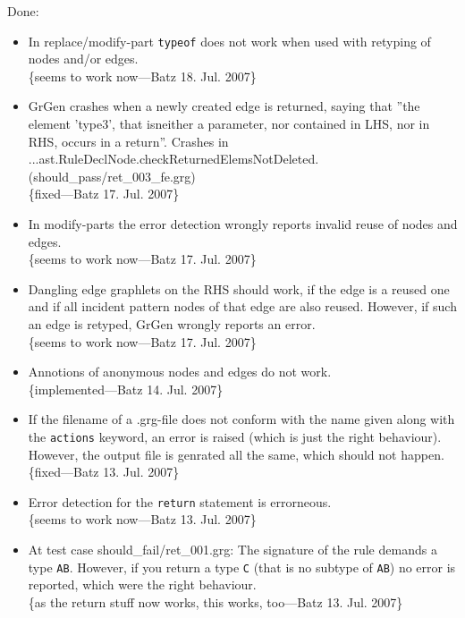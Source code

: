 \documentclass[12pt,a4paper]{article}
\begin{document}
\noindent
Done:
\begin{itemize}
	\item In replace/modify-part {\tt typeof} does not work when used with retyping of nodes and/or edges.\\
		\{seems to work now---Batz 18. Jul. 2007\}
    \item GrGen crashes when a newly created edge is returned, saying that ''the element 'type3', that isneither a parameter, nor contained in LHS, nor in RHS, occurs in a return''.
		Crashes in\\
		...ast.RuleDeclNode.checkReturnedElemsNotDeleted.\\
		(should\_pass/ret\_003\_fe.grg)\\
		\{fixed---Batz 17. Jul. 2007\}
	\item In modify-parts the error detection wrongly reports invalid reuse of nodes and edges.\\
		\{seems to work now---Batz 17. Jul. 2007\}
	\item Dangling edge graphlets on the RHS should work, if the edge is a reused one and if all incident pattern nodes of that edge are also reused.
    However, if such an edge is retyped, GrGen wrongly reports an error.\\
		\{seems to work now---Batz 17. Jul. 2007\}
	\item Annotions of anonymous nodes and edges do not work.\\
		\{implemented---Batz 14. Jul. 2007\}
	\item If the filename of a .grg-file does not conform with the name given along with the {\tt actions} keyword, an error is raised (which is just the right behaviour). However, the output file is genrated all the same, which should not happen.\\
    \{fixed---Batz 13. Jul. 2007\}
	\item Error detection for the {\tt return} statement is errorneous.\\
		\{seems to work now---Batz 13. Jul. 2007\}
	\item At test case should\_fail/ret\_001.grg:
  	The signature of the rule demands a type {\tt AB}.
	However, if you return a type {\tt C} (that is no subtype of {\tt AB}) no error is reported, which were the right behaviour.\\
		\{as the return stuff now works, this works, too---Batz 13. Jul. 2007\}
\end{itemize}
\end{document}
